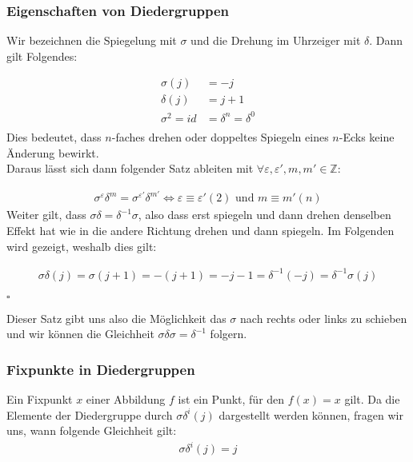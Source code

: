\documentclass[12pt, german]{article}
\newcommand{\bewiesen}{
	
	\begin{flushright}
		$\square$  \\
\end{flushright}}
\begin{document}
	
	\subsubsection{Eigenschaften von Diedergruppen}
	\label{sec:diederEigenschaften}
	Wir bezeichnen die Spiegelung mit $\sigma$ und die Drehung im Uhrzeiger mit $\delta$. Dann gilt Folgendes:
	
	\begin{align*}
		\sigma(j)&=-j\\
		\delta(j)&=j+1\\
		\sigma^2 = id &= \delta^n = \delta^0 \\ 	 
	\end{align*}
	Dies bedeutet, dass $n$-faches drehen oder doppeltes Spiegeln eines  $n$-Ecks keine Änderung bewirkt.  \\
	Daraus lässt sich dann folgender Satz ableiten mit $\forall \varepsilon, \varepsilon', m, m' \in \mathbb{Z}$: 
	
	\begin{align*}
		\sigma^\varepsilon\delta^m = \sigma^{\varepsilon'}\delta^{m'} \iff \varepsilon \equiv \varepsilon' (2) \text{ und } m \equiv m' (n)
	\end{align*}
	Weiter gilt, dass $\sigma\delta = \delta^{-1}\sigma$, also dass erst spiegeln und dann drehen denselben Effekt hat wie in die andere Richtung drehen und dann spiegeln. Im Folgenden wird gezeigt, weshalb dies gilt:
	
	\begin{align*}
		\sigma \delta(j) = \sigma(j+1) = -(j + 1) = -j -1 = \delta^{-1}(-j)=\delta^{-1}\sigma(j)
	\end{align*}
	\bewiesen
	Dieser Satz gibt uns also die Möglichkeit das $\sigma$ nach rechts oder links zu schieben und wir können die Gleichheit $\sigma\delta\sigma = \delta^{-1}$ folgern.
	
	\subsubsection{Fixpunkte in Diedergruppen}
	Ein Fixpunkt $x$ einer Abbildung $f$ ist ein Punkt, für den $f(x) = x$ gilt. Da die Elemente der Diedergruppe durch $\sigma\delta^i(j)$ dargestellt werden können, fragen wir uns, wann folgende Gleichheit gilt:
	\begin{align*}
		\sigma\delta^i(j) = j
	\end{align*} 
	
\end{document}
